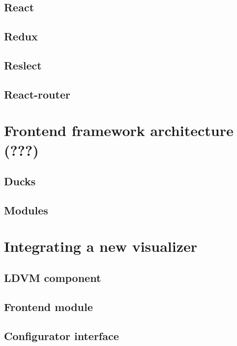 \subsection{React}

\subsection{Redux}

\subsection{Reslect}

\subsection{React-router}



\section{Frontend framework architecture (???)}

\subsection{Ducks}

\subsection{Modules}



\section{Integrating a new visualizer}

\subsection{LDVM component}

\subsection{Frontend module}

\subsection{Configurator interface}

